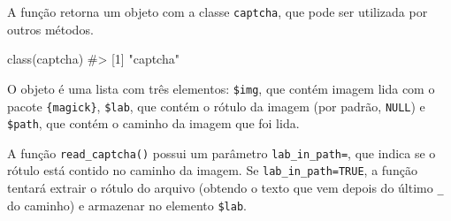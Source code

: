 \documentclass[12pt,twoside,brazilian]{book}
\newenvironment{Shaded}{\begin{snugshade}}{\end{snugshade}}
\newcommand{\AttributeTok}[1]{\textcolor[rgb]{0.40,0.45,0.13}{#1}}
\newcommand{\CommentTok}[1]{\textcolor[rgb]{0.37,0.37,0.37}{#1}}
\newcommand{\ConstantTok}[1]{\textcolor[rgb]{0.56,0.35,0.01}{#1}}
\newcommand{\FunctionTok}[1]{\textcolor[rgb]{0.28,0.35,0.67}{#1}}
\newcommand{\NormalTok}[1]{\textcolor[rgb]{0.00,0.23,0.31}{#1}}
\newcommand{\OtherTok}[1]{\textcolor[rgb]{0.00,0.23,0.31}{#1}}
\newcommand{\StringTok}[1]{\textcolor[rgb]{0.13,0.47,0.30}{#1}}
\begin{document}
A função retorna um objeto com a classe \texttt{captcha}, que pode ser
utilizada por outros métodos.

\begin{Shaded}
\begin{Highlighting}[]
\FunctionTok{class}\NormalTok{(captcha)}
\CommentTok{\#\textgreater{} [1] "captcha"}
\end{Highlighting}
\end{Shaded}

O objeto é uma lista com três elementos: \texttt{\$img}, que contém
imagem lida com o pacote \texttt{\{magick\}}, \texttt{\$lab}, que contém
o rótulo da imagem (por padrão, \texttt{NULL}) e \texttt{\$path}, que
contém o caminho da imagem que foi lida.

\begin{Shaded}
\end{Shaded}

A função \texttt{read\_captcha()} possui um parâmetro
\texttt{lab\_in\_path=}, que indica se o rótulo está contido no caminho
da imagem. Se \texttt{lab\_in\_path=TRUE}, a função tentará extrair o
rótulo do arquivo (obtendo o texto que vem depois do último \texttt{\_}
do caminho) e armazenar no elemento \texttt{\$lab}.

\begin{Shaded}
\end{Shaded}
\end{document}
